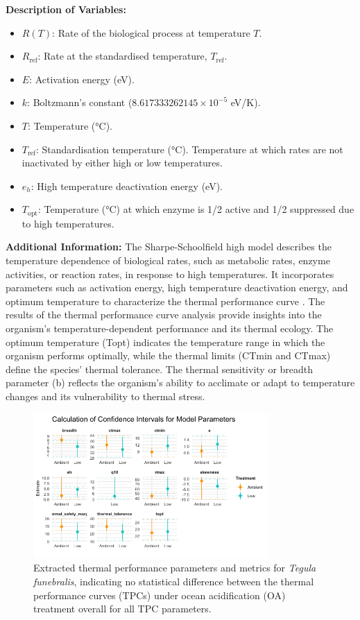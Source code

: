 \documentclass[
]{article}
\begin{document}
\textbf{Description of Variables:}

\begin{itemize}
    \item \( R(T) \): Rate of the biological process at temperature \( T \).
    \item \( R_{\text{ref}} \): Rate at the standardised temperature, \( T_{\text{ref}} \).
    \item \( E \): Activation energy (eV).
    \item \( k \): Boltzmann's constant (\( 8.617333262145 \times 10^{-5} \) eV/K).
    \item \( T \): Temperature (°C).
    \item \( T_{\text{ref}} \): Standardisation temperature (°C). Temperature at which rates are not inactivated by either high or low temperatures.
    \item \( e_h \): High temperature deactivation energy (eV).
    \item \( T_{\text{opt}} \): Temperature (°C) at which enzyme is 1/2 active and 1/2 suppressed due to high temperatures.
\end{itemize}

\textbf{Additional Information:} The Sharpe-Schoolfield high model
describes the temperature dependence of biological rates, such as
metabolic rates, enzyme activities, or reaction rates, in response to
high temperatures. It incorporates parameters such as activation energy,
high temperature deactivation energy, and optimum temperature to
characterize the thermal performance curve \cite{sharpe1981non}. The
results of the thermal performance curve analysis provide insights into
the organism's temperature-dependent performance and its thermal
ecology. The optimum temperature (Topt) indicates the temperature range
in which the organism performs optimally, while the thermal limits
(CTmin and CTmax) define the species' thermal tolerance. The thermal
sensitivity or breadth parameter (b) reflects the organism's ability to
acclimate or adapt to temperature changes and its vulnerability to
thermal stress.

\begin{figure}[htbp]
  \centering
  \includegraphics[width=0.8\textwidth]{Images/params.jpg}
  \caption{Extracted thermal performance parameters and metrics for \textit{Tegula funebralis}, indicating no statistical difference between the thermal performance curves (TPCs) under ocean acidification (OA) treatment overall for all TPC parameters.}
  \label{fig:tpc-params}
\end{figure}
\end{document}
